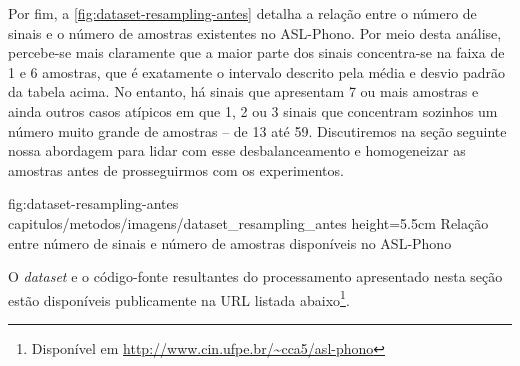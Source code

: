Por fim, a \autoref{fig:dataset-resampling-antes} detalha a relação entre o número de sinais e o número de amostras existentes no ASL-Phono. Por meio desta análise, percebe-se mais claramente que a maior parte dos sinais concentra-se na faixa de 1 e 6 amostras, que é exatamente o intervalo descrito pela média e desvio padrão da tabela acima.
No entanto, há sinais que apresentam 7 ou mais amostras e ainda outros casos atípicos em que 1, 2 ou 3 sinais que concentram sozinhos um número muito grande de amostras -- de 13 até 59.
Discutiremos na seção seguinte nossa abordagem para lidar com esse desbalanceamento e homogeneizar as amostras antes de prosseguirmos com os experimentos.

\figura
{fig:dataset-resampling-antes} %
{capitulos/metodos/imagens/dataset_resampling_antes} %
{height=5.5cm} %
{Relação entre número de sinais e número de amostras disponíveis no ASL-Phono} %
{} %


O \textit{dataset} e o código-fonte resultantes do processamento apresentado nesta seção estão disponíveis publicamente na URL listada abaixo\footnote{Disponível em \url{http://www.cin.ufpe.br/~cca5/asl-phono}}.
